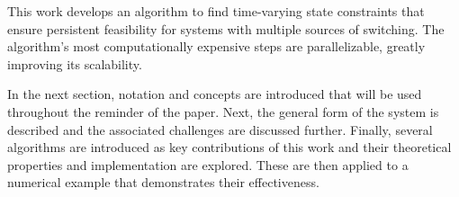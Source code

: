 This work develops an algorithm to find time-varying state constraints that ensure persistent feasibility for systems with multiple sources of switching. The algorithm's most computationally expensive steps are parallelizable, greatly improving its scalability. 

In the next section, notation and concepts are introduced that will be used throughout the reminder of the paper. Next, the general form of the system is described and the associated challenges are discussed further. Finally, several algorithms are introduced as key contributions of this work and their theoretical properties and implementation are explored. These are then applied to a numerical example that demonstrates their effectiveness. 